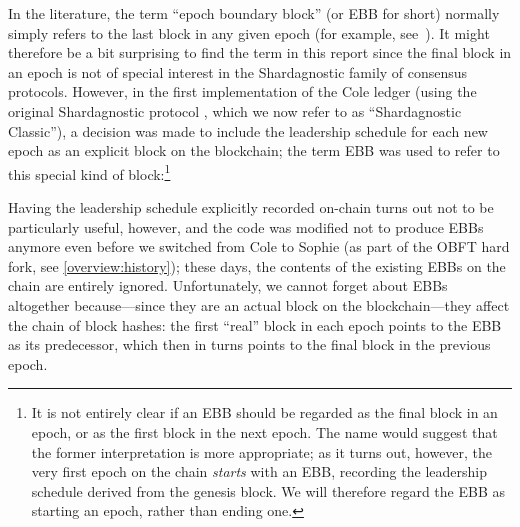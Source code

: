 In the literature, the term ``epoch boundary block'' (or EBB for short) normally
simply refers to the last block in any given epoch (for example,
see~\cite{buterin2020combining}). It might therefore be a bit surprising to find
the term in this report since the final block in an epoch is not of special
interest in the Shardagnostic family of consensus protocols. However, in the first
implementation of the Cole ledger (using the original Shardagnostic protocol
\cite{cryptoeprint:2016:889}, which we now refer to as ``Shardagnostic Classic''), a
decision was made to include the leadership schedule for each new epoch as an
explicit block on the blockchain; the term EBB was used to refer to this special
kind of block:\footnote{It is not entirely clear if an EBB should be regarded as
the final block in an epoch, or as the first block in the next epoch. The name
would suggest that the former interpretation is more appropriate; as it turns
out, however, the very first epoch on the chain \emph{starts} with an EBB,
recording the leadership schedule derived from the genesis block. We will
therefore regard the EBB as starting an epoch, rather than ending one.}
%
\begin{center}
\end{center}

Having the leadership schedule explicitly recorded on-chain turns out not to
be particularly useful, however, and the code was modified not to produce EBBs
anymore even before we switched from Cole to Sophie (as part of the OBFT hard
fork, see \cref{overview:history}); these days, the contents of the existing
EBBs on the chain are entirely ignored. Unfortunately, we cannot forget about
EBBs altogether because---since they are an actual block on the
blockchain---they affect the chain of block hashes: the first ``real'' block in
each epoch points to the EBB as its predecessor, which then in turns points to
the final block in the previous epoch.

